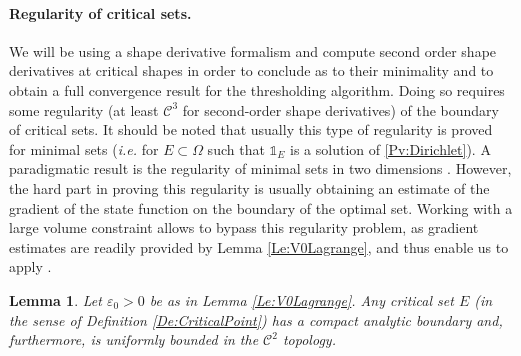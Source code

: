 \documentclass{article}
\def\e{{\varepsilon}}
\newtheorem{lemma}[material]{Lemma}
\def\O{{\Omega}}
\numberwithin{equation}{section}
\begin{document}
\paragraph{Regularity of critical sets.} We will be using a shape derivative formalism and compute second order shape derivatives at critical shapes in order to conclude as to their minimality and to obtain a full convergence result for the thresholding algorithm. Doing so requires some regularity (at least $\mathscr C^3$ for second-order shape derivatives) of the boundary of critical sets. It should be noted that usually this type of regularity is proved for minimal sets (\emph{i.e.} for $E\subset \O$ such that $\mathds 1_E$ is a solution of \eqref{Pv:Dirichlet}). A paradigmatic result is the regularity of minimal sets in two dimensions \cite{Chanillo2008}. However, the hard part in proving this regularity is usually obtaining an estimate of the gradient of the state function on the boundary of the optimal set. Working with a large volume constraint allows to bypass this regularity problem, as gradient estimates are readily provided by Lemma \ref{Le:V0Lagrange}, and thus enable us to apply \cite[Lemma 3, Theorem 8]{Chanillo_2000}.
\begin{lemma}\label{Le:CriticalPointRegular}
Let $\e_0>0$ be as in Lemma \ref{Le:V0Lagrange}. Any critical set $E$ (in the sense of Definition \ref{De:CriticalPoint}) has a compact analytic boundary and, furthermore, is uniformly bounded in the $\mathscr C^2$ topology.
\end{lemma}
\end{document}
